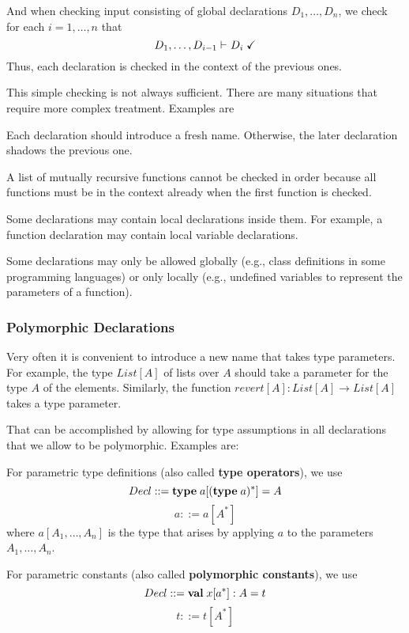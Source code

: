 And when checking input consisting of global declarations $D_1,\ldots,D_n$, we check for each $i=1,\ldots,n$ that
 \[D_1,\ldots,D_{i-1}\vdash^{}_{}D_i\;\checkmark\]
Thus, each declaration is checked in the context of the previous ones.
\medskip

This simple checking is not always sufficient.
There are many situations that require more complex treatment.
Examples are
\begin{compactitem}
 \item Each declaration should introduce a fresh name. Otherwise, the later declaration shadows the previous one.
 \item A list of mutually recursive functions cannot be checked in order because all functions must be in the context already when the first function is checked.
 \item Some declarations may contain local declarations inside them. For example, a function declaration may contain local variable declarations.
 \item Some declarations may only be allowed globally (e.g., class definitions in some programming languages) or only locally (e.g., undefined variables to represent the parameters of a function).
\end{compactitem}

\subsubsection{Polymorphic Declarations}

Very often it is convenient to introduce a new name that takes type parameters.
For example, the type $List[A]$ of lists over $A$ should take a parameter for the type $A$ of the elements.
Similarly, the function $revert[A]:List[A]\to List[A]$ takes a type parameter.

That can be accomplished by allowing for type assumptions in all declarations that we allow to be polymorphic.
Examples are:
\begin{compactitem}
 \item For parametric type definitions (also called \textbf{type operators}), we use
  \[Decl ::= \atypedef{a[(\atypedef{a}{})^*]}{A}\]
  \[a ::= a[A^*]\]
  where $a[A_1,\ldots,A_n]$ is the type that arises by applying $a$ to the parameters $A_1,\ldots,A_n$.
 \item For parametric constants (also called \textbf{polymorphic constants}), we use
  \[Decl ::= \aval{x[a^*]}{A}{t}\]
  \[t ::= t[A^*]\]
\end{compactitem}


